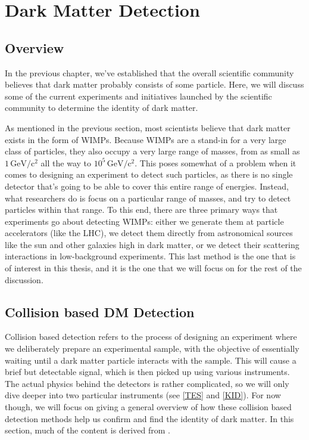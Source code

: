 \chapter{Dark Matter Detection}

\section{Overview}
In the previous chapter, we've established that the overall scientific community believes that dark matter
probably consists of some particle. Here, we will discuss some of the current experiments and initiatives
launched by the scientific community to determine the identity of dark matter. 

As mentioned in the previous section, most scientists believe that dark matter exists in the form of WIMPs.
Because WIMPs are a stand-in for a very large class of particles, they also occupy a very large range of
masses, from as small as \( 1 \, \mathrm{GeV / c^2} \) all the way to \( 10^{5} \, \mathrm{GeV / c^2} \).
This poses somewhat of a problem when it comes to designing an experiment to detect such particles, as there
is no single detector that's going to be able to cover this entire range of energies. Instead, what
researchers do is focus on a particular range of masses, and try to detect particles within that range. To
this end, there are three primary ways that experiments go about detecting WIMPs: either we generate them at
particle accelerators (like the LHC), we detect them directly from astronomical sources like the sun and
other galaxies high in dark matter, or we detect their scattering interactions in low-background experiments.
This last method is the one that is of interest in this thesis, and it is the one that we will focus on for
the rest of the discussion.  


\section{Collision based DM Detection}
Collision based detection refers to the process of designing an experiment where we deliberately prepare an
experimental sample, with the objective of essentially waiting until a dark matter particle interacts with
the sample. This will cause a brief but detectable signal, which is then picked up using various instruments.
The actual physics behind the detectors is rather complicated, so we will only dive deeper into two
particular instruments (see \cref{TES} and \cref{KID}). For now though, we will focus on giving a
general overview of how these collision based detection methods help us confirm and find the identity of dark
matter. In this section, much of the content is derived from \cite{schumannDirectDetectionWIMP2019}.

